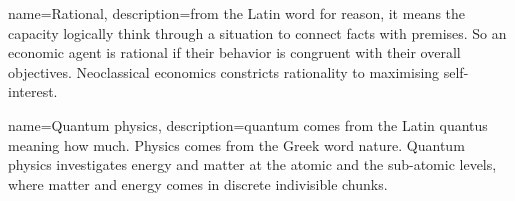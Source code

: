 {
  name=Rational,
  description={from the Latin word for reason, it means the capacity logically think through a situation to connect facts with premises. So an economic agent is rational if their behavior is congruent with their overall objectives. Neoclassical economics constricts rationality to maximising self-interest.}
}




{
  name=Quantum physics,
  description={quantum comes from the Latin quantus meaning how much. Physics comes from the Greek word nature. Quantum physics investigates energy and matter at the atomic and the sub-atomic levels, where matter and energy comes in discrete indivisible chunks.}
}